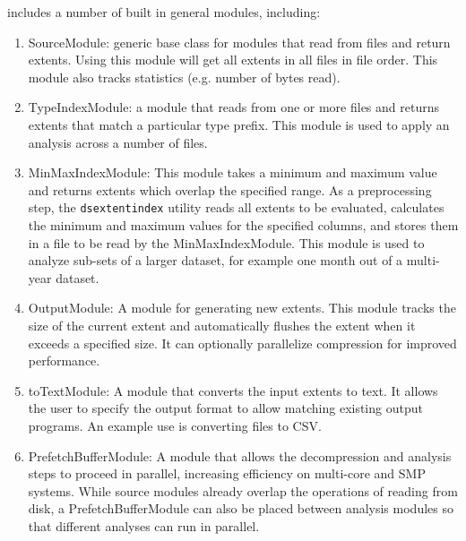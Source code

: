 \DataSeries{} includes a number of built in general modules, including:
\begin{enumerate} 

\item SourceModule: generic base class for modules that read from 
 files and return extents.  Using this module will get all extents 
 in all files in file order.  This module also tracks statistics (e.g. number of bytes read).

  \item TypeIndexModule: a module that reads from one or more files and
returns extents that match a particular type prefix.  This module is used
to apply an analysis across a number of files.

  \item MinMaxIndexModule: This module takes a minimum and maximum
value and returns extents which overlap the specified range.  As a
preprocessing step, the {\tt dsextentindex} utility reads all extents
to be evaluated, calculates the minimum and maximum values for the
specified columns, and stores them in a file to be read by the
MinMaxIndexModule.  This module is used to analyze sub-sets of a larger
dataset, for example one month out of a multi-year dataset.


  \item OutputModule: A module for generating new extents.  This
module tracks the size of the current extent and automatically flushes
the extent when it exceeds a specified size.  It can optionally parallelize
compression for improved performance.

  \item \DS{}toTextModule: A module that converts the input extents to
text.  It allows the user to specify the output format to allow
matching existing output programs.  An example use is
converting \DataSeries{} files to CSV.

  \item PrefetchBufferModule: A module that allows the decompression
and analysis steps to proceed in parallel, increasing efficiency on
multi-core and SMP systems.  While source modules
already overlap the operations of reading from disk,  a PrefetchBufferModule 
can also be placed between analysis modules so that different analyses
can run in parallel.


\end{enumerate}
